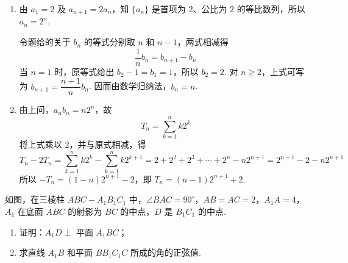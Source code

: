 \begin{solution}
\begin{enumerate}
\item 由 \(a_1=2\) 及 \(a_{n+1}=2a_n\)，知 \(\{a_n\}\) 是首项为 \(2\)、公比为 \(2\) 的等比数列，所以 \(a_n=2^n\).

令题给的关于 \(b_n\) 的等式分别取 \(n\) 和 \(n-1\)，两式相减得
\[
\frac1n b_n=b_{n+1}-b_n
\]
当 \(n=1\) 时，原等式给出 \(b_2-1=b_1=1\)，所以 \(b_2=2\). 对 \(n\geqslant2\)，上式可写为 \(b_{n+1}=\dfrac{n+1}{n}b_n\). 因而由数学归纳法，\(b_n=n\).

\item 由上问，\(a_nb_n=n2^n\)，故
\[
T_n=\sum_{k=1}^n k2^k
\]
将上式乘以 \(2\)，并与原式相减，得
\[
T_n-2T_n=\sum_{k=1}^n k2^k-\sum_{k=1}^n k2^{k+1}=2+2^2+2^3+\cdots+2^n-n2^{n+1}
=2^{n+1}-2-n2^{n+1}
\]
所以 \(-T_n=(1-n)2^{n+1}-2\)，即 \(T_n=(n-1)2^{n+1}+2\).
\end{enumerate}
\end{solution}

\begin{problem}
如图，在三棱柱 \(ABC-A_1B_1C_1\) 中，\(\angle BAC=90^\circ\)，\(AB=AC=2\)，\(A_1A=4\)，\(A_1\) 在底面 \(ABC\) 的射影为 \(BC\) 的中点，\(D\) 是 \(B_1C_1\) 的中点.

\begin{enumerate}
\item 证明：\(A_1D\perp\) 平面 \(A_1BC\)；
\item 求直线 \(A_1B\) 和平面 \(BB_1C_1C\) 所成的角的正弦值.
\end{enumerate}

\end{problem}


